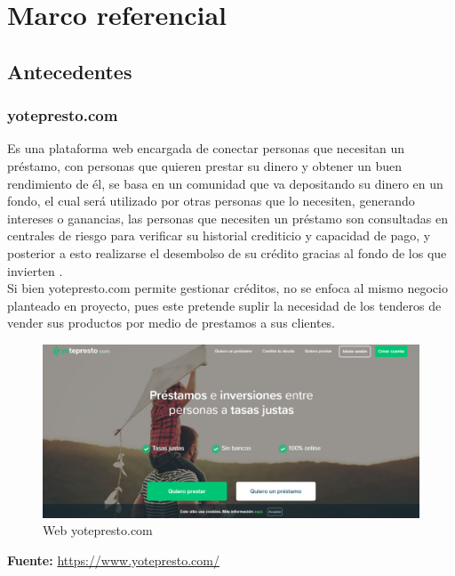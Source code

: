 \section{Marco referencial}

	\subsection{Antecedentes}
	
		\subsubsection{yotepresto.com}
		
		{Es una plataforma web encargada de conectar personas que necesitan un préstamo, con personas que quieren prestar su dinero y obtener un buen rendimiento de él, se basa en un comunidad que va depositando su dinero en un fondo, el cual será utilizado por otras personas que lo necesiten, generando intereses o ganancias, las personas que necesiten un préstamo son consultadas en centrales de riesgo para verificar su historial crediticio y capacidad de pago, y posterior a esto realizarse el desembolso de su crédito gracias al fondo de los que invierten \cite{yotepresto}.\\
			
		Si bien yotepresto.com permite gestionar créditos, no se enfoca al mismo negocio planteado en proyecto, pues este pretende suplir la necesidad de los tenderos de vender sus productos por medio de prestamos a sus clientes.\\
		
		\begin{figure}[H]
			\centering
			\includegraphics[width=0.8\linewidth]{description/framework/yotepresto.png}
			\caption{Web yotepresto.com}
		\end{figure}
	
		\begin{center}
			\textbf{Fuente:} \url{https://www.yotepresto.com/}
		\end{center}
		}
	
